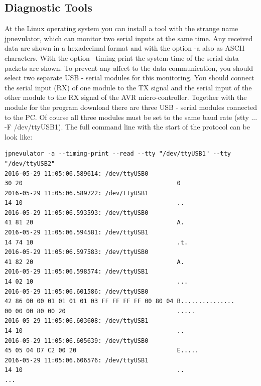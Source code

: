 \subsection{Diagnostic Tools}
At the Linux operating system you can install a tool with the strange name jpnevulator, which
can monitor two serial inputs at the same time.
Any received data are shown in a hexadecimal format and with the option -a also as ASCII characters.
With the option --timing-print the system time of the serial data packets are shown.
To prevent any affect to the data communication, you should select two
separate USB - serial modules for this monitoring.
You should connect the serial input (RX) of one module to the TX signal and the 
serial input of the other module to the RX signal of the AVR micro-controller.
Together with the module for the program download there are three USB - serial modules
connected to the PC.
Of course all three modules must be set to the same baud rate (stty ... -F /dev/ttyUSB1).
The full command line with the start of the protocol can be look like:
\begin{verbatim}
jpnevulator -a --timing-print --read --tty "/dev/ttyUSB1" --tty "/dev/ttyUSB2"
2016-05-29 11:05:06.589614: /dev/ttyUSB0
30 20                                           0
2016-05-29 11:05:06.589722: /dev/ttyUSB1
14 10                                           ..
2016-05-29 11:05:06.593593: /dev/ttyUSB0
41 81 20                                        A.
2016-05-29 11:05:06.594581: /dev/ttyUSB1
14 74 10                                        .t.
2016-05-29 11:05:06.597583: /dev/ttyUSB0
41 82 20                                        A.
2016-05-29 11:05:06.598574: /dev/ttyUSB1
14 02 10                                        ...
2016-05-29 11:05:06.601586: /dev/ttyUSB0
42 86 00 00 01 01 01 01 03 FF FF FF FF 00 80 04 B...............
00 00 00 80 00 20                               .....
2016-05-29 11:05:06.603608: /dev/ttyUSB1
14 10                                           ..
2016-05-29 11:05:06.605639: /dev/ttyUSB0
45 05 04 D7 C2 00 20                            E.....
2016-05-29 11:05:06.606576: /dev/ttyUSB1
14 10                                           ..
...
\end{verbatim}
